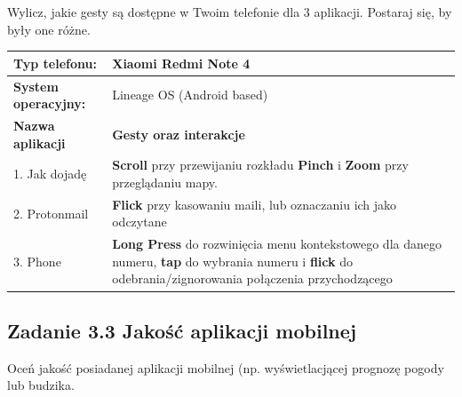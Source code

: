 \documentclass[12pt]{article}
\begin{document}
    Wylicz, jakie gesty są dostępne w Twoim telefonie dla 3 aplikacji. Postaraj się, by były one różne.

    \begin{longtable}{|p{}|p{}|}
        \hline
        \textbf{Typ telefonu:} & Xiaomi Redmi Note 4\\
        \hline
        \textbf{System operacyjny:} & Lineage OS (Android based)\\
        \hline
        \textbf{Nazwa aplikacji} & \textbf{Gesty oraz interakcje}\\
        1. Jak dojadę & \textbf{Scroll} przy przewijaniu rozkładu \textbf{Pinch} i \textbf{Zoom} przy przeglądaniu mapy.\\
        2. Protonmail & \textbf{Flick} przy kasowaniu maili, lub oznaczaniu ich jako odczytane\\
        3. Phone & \textbf{Long Press} do rozwinięcia menu kontekstowego dla danego numeru, \textbf{tap} do wybrania numeru i \textbf{flick} do odebrania/zignorowania połączenia przychodzącego\\
    \end{longtable}

    \subsection{Zadanie 3.3 Jakość aplikacji mobilnej}

    Oceń jakość posiadanej aplikacji mobilnej (np. wyświetlacjącej prognozę pogody lub budzika.
\end{document}
